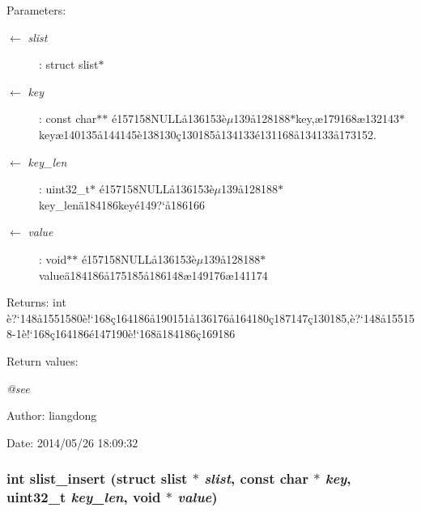 \begin{Desc}
\item[Parameters:]
\begin{description}
\item[\mbox{$\leftarrow$} {\em slist}]: struct slist$\ast$ \item[\mbox{$\leftarrow$} {\em key}]: const char$\ast$$\ast$ \'{e}157158NULL\aa{}136153\`{e}$\mu$139\aa{}128188$\ast$key,\ae{}179168\ae{}132143$\ast$key\ae{}140135\aa{}144145\`{e}138130\c{c}130185\aa{}134133\'{e}131168\aa{}134133\aa{}173152. \item[\mbox{$\leftarrow$} {\em key\_\-len}]: uint32\_\-t$\ast$ \'{e}157158NULL\aa{}136153\`{e}$\mu$139\aa{}128188$\ast$key\_\-len\"{a}184186key\'{e}149?`\aa{}186166 \item[\mbox{$\leftarrow$} {\em value}]: void$\ast$$\ast$ \'{e}157158NULL\aa{}136153\`{e}$\mu$139\aa{}128188$\ast$value\"{a}184186\aa{}175185\aa{}186148\ae{}149176\ae{}141174 \end{description}
\end{Desc}
\begin{Desc}
\item[Returns:]int \`{e}?`148\aa{}1551580\`{e}!`168\c{c}164186\aa{}190151\aa{}136176\aa{}164180\c{c}187147\c{c}130185,\`{e}?`148\aa{}155158-1\`{e}!`168\c{c}164186\'{e}147190\`{e}!`168\"{a}184186\c{c}169186 \end{Desc}
\begin{Desc}
\item[Return values:]
\begin{description}
\item[{\em @see}]\end{description}
\end{Desc}
\begin{Desc}
\item[Author:]liangdong \end{Desc}
\begin{Desc}
\item[Date:]2014/05/26 18:09:32 \end{Desc}
\subsubsection{\setlength{\rightskip}{0pt plus 5cm}int slist\_\-insert (struct slist $\ast$ {\em slist}, const char $\ast$ {\em key}, uint32\_\-t {\em key\_\-len}, void $\ast$ {\em value})}\label{slist_8c_a7}


